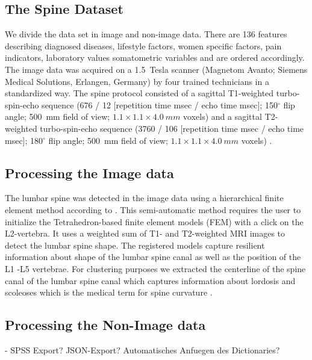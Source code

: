 \documentclass[journal]{style/vgtc} 			          %
\begin{document}
\subsection{The Spine Dataset}
We divide the data set in image and non-image data.
%
There are 136 features describing diagnosed diseases, lifestyle factors, women specific factors, pain indicators, laboratory values somatometric variables and are ordered accordingly.
%
The image data was acquired on a 1.5~Tesla scanner (Magnetom Avanto; Siemens Medical Solutions, Erlangen, Germany) by four trained technicians in a standardized way.
%
The spine protocol consisted of a sagittal T1-weighted turbo-spin-echo sequence (676 / 12 [repetition time msec / echo time msec]; 150$^\circ$ flip angle; 500~mm field of view; $1.1\times1.1\times4.0~mm$ voxels) and a sagittal T2-weighted turbo-spin-echo sequence (3760 / 106 [repetition time msec / echo time msec]; 180$^\circ$ flip angle; 500~mm field of view; $1.1\times1.1\times4.0~mm$ voxels) \cite{Hegenscheid2013}.

\subsection{Processing the Image data}
The lumbar spine was detected in the image data using a hierarchical finite element method according to \cite{Rak2013}.
%
This semi-automatic method requires the user to initialize the Tetrahedron-based finite element models (FEM) with a click on the L2-vertebra.
%
It uses a weighted sum of T1- and T2-weighted MRI images to detect the lumbar spine shape.
%
The registered models capture resilient information about shape of the lumbar spine canal as well as the position of the L1 -L5 vertebrae.
%
For clustering purposes we extracted the centerline of the spine canal of the lumbar spine canal which captures information about lordosis and scoleoses which is the medical term for spine curvature \cite{Klemm2013VMV}.
%
\subsection{Processing the Non-Image data}
- SPSS Export? JSON-Export? Automatisches Anfuegen des Dictionaries?

\end{document}
